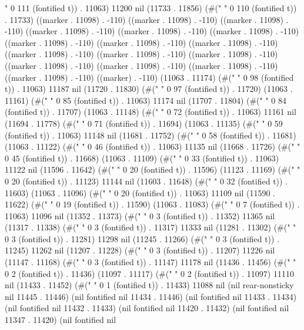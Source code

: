 {                                                                                            " 0 111 (fontified t)) . 11063) 11200 nil (11733 . 11856) (#("                                                                                                              " 0 110 (fontified t)) . 11733) ((marker . 11098) . -110) ((marker . 11098) . -110) ((marker . 11098) . -110) ((marker . 11098) . -110) ((marker . 11098) . -110) ((marker . 11098) . -110) ((marker . 11098) . -110) ((marker . 11098) . -110) ((marker . 11098) . -110) ((marker . 11098) . -110) ((marker . 11098) . -110) ((marker . 11098) . -110) ((marker . 11098) . -110) ((marker . 11098) . -110) ((marker . 11098) . -110) ((marker . 11098) . -110) ((marker) . -110) (11063 . 11174) (#("                                                                                                  " 0 98 (fontified t)) . 11063) 11187 nil (11720 . 11830) (#("                                                                                                 " 0 97 (fontified t)) . 11720) (11063 . 11161) (#("                                                                                     " 0 85 (fontified t)) . 11063) 11174 nil (11707 . 11804) (#("                                                                                    " 0 84 (fontified t)) . 11707) (11063 . 11148) (#("                                                                        " 0 72 (fontified t)) . 11063) 11161 nil (11694 . 11778) (#("                                                                       " 0 71 (fontified t)) . 11694) (11063 . 11135) (#("                                                           " 0 59 (fontified t)) . 11063) 11148 nil (11681 . 11752) (#("                                                          " 0 58 (fontified t)) . 11681) (11063 . 11122) (#("                                              " 0 46 (fontified t)) . 11063) 11135 nil (11668 . 11726) (#("                                             " 0 45 (fontified t)) . 11668) (11063 . 11109) (#("                                 " 0 33 (fontified t)) . 11063) 11122 nil (11596 . 11642) (#("                    " 0 20 (fontified t)) . 11596) (11123 . 11169) (#("                    " 0 20 (fontified t)) . 11123) 11144 nil (11603 . 11648) (#("                                " 0 32 (fontified t)) . 11603) (11063 . 11096) (#("                    " 0 20 (fontified t)) . 11063) 11109 nil (11590 . 11622) (#("                   " 0 19 (fontified t)) . 11590) (11063 . 11083) (#("       " 0 7 (fontified t)) . 11063) 11096 nil (11352 . 11373) (#("   " 0 3 (fontified t)) . 11352) 11365 nil (11317 . 11338) (#("   " 0 3 (fontified t)) . 11317) 11333 nil (11281 . 11302) (#("   " 0 3 (fontified t)) . 11281) 11298 nil (11245 . 11266) (#("   " 0 3 (fontified t)) . 11245) 11262 nil (11207 . 11228) (#("   " 0 3 (fontified t)) . 11207) 11226 nil (11147 . 11168) (#("   " 0 3 (fontified t)) . 11147) 11178 nil (11436 . 11456) (#("  " 0 2 (fontified t)) . 11436) (11097 . 11117) (#("  " 0 2 (fontified t)) . 11097) 11110 nil (11433 . 11452) (#(" " 0 1 (fontified t)) . 11433) 11088 nil (nil rear-nonsticky nil 11445 . 11446) (nil fontified nil 11434 . 11446) (nil fontified nil 11433 . 11434) (nil fontified nil 11432 . 11433) (nil fontified nil 11420 . 11432) (nil fontified nil 11347 . 11420) (nil fontified nil }
